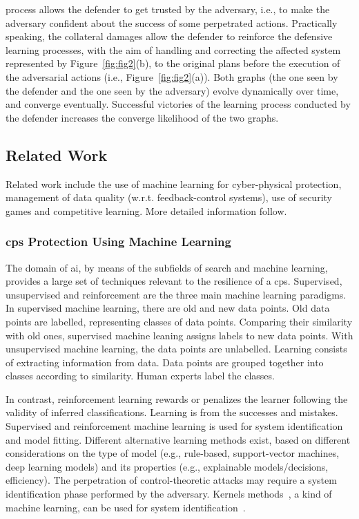 \documentclass[letterpaper, 10pt, conference]{IEEEtran}
\begin{document}
process allows the defender to get trusted by the adversary, i.e., to
make the adversary confident about the success of some perpetrated
actions. Practically speaking, the collateral damages allow the
defender to reinforce the defensive learning processes, with the aim
of handling and correcting the affected system represented by
Figure~\ref{fig:fig2}(b), to the original plans before the execution
of the adversarial actions (i.e., Figure~\ref{fig:fig2}(a)). Both
graphs (the one seen by the defender and the one seen by the
adversary) evolve dynamically over time, and converge eventually.
Successful victories of the learning process conducted by the defender
increases the converge likelihood of the two graphs.

\subsection{Related Work}

Related work include the use of machine learning for cyber-physical
protection, management of data quality (w.r.t. feedback-control
systems), use of security games and competitive learning. More
detailed information follow.

\medskip

\subsubsection{\gls*{cps} Protection Using Machine
Learning}

The domain of \gls*{ai}, by means of the subfields of search and
machine learning, provides a large set of techniques relevant to the
resilience of a \gls*{cps}. Supervised, unsupervised and reinforcement
are the three main machine learning paradigms. In supervised machine
learning, there are old and new data points. Old data points are
labelled, representing classes of data points. Comparing their
similarity with old ones, supervised machine leaning assigns labels to
new data points. With unsupervised machine learning, the data points
are unlabelled. Learning consists of extracting information from data.
Data points are grouped together into classes according to similarity.
Human experts label the classes.

In contrast, reinforcement learning rewards or penalizes the learner
following the validity of inferred classifications. Learning is from
the successes and mistakes. Supervised and reinforcement machine
learning is used for system identification and model fitting.
Different alternative learning methods exist, based on different
considerations on the type of model (e.g., rule-based, support-vector
machines, deep learning models) and its properties (e.g., explainable
models/decisions, efficiency). The perpetration of control-theoretic
attacks \cite{Teixeira2015,smith2015covert} may require a system
identification phase performed by the adversary. Kernels
methods~\cite{shawe2004kernel}, a kind of machine learning, can be
used for system
identification~\cite{PILLONETTO2014657,PILLONETTO201081}.
\end{document}
